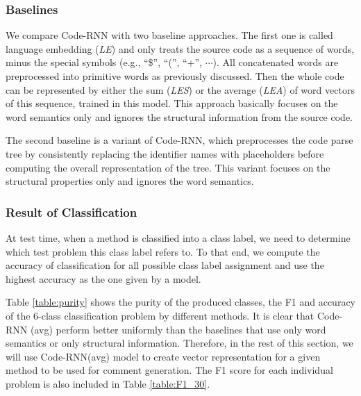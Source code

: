 \subsubsection{Baselines}

We compare Code-RNN with two baseline approaches.
The first one is called language embedding (\emph{LE}) and only treats the
source code as a sequence of words, minus the special symbols
(e.g., ``\$'', ``('', ``+'', $\cdots$). All concatenated words are preprocessed
into primitive words as previously discussed. Then the whole code can be
represented by either the sum (\emph{LES}) or the average (\emph{LEA})  of word vectors
of this sequence, trained in this model.%
This approach basically focuses on the word semantics only and ignores the
structural information from the source code.

The second baseline is a variant of Code-RNN, which preprocesses the code parse
tree by consistently replacing the identifier names with placeholders before
computing the overall representation of the tree. This variant focuses on
the structural properties only and ignores the word semantics.


\subsubsection{Result of Classification}
At test time, when a method is classified into a class label,
we need to determine which test problem this class label refers to.
To that end, we compute the accuracy of classification for
all possible class label assignment and use the highest
accuracy as the one given by a model.

Table \ref{table:purity} shows the purity of the produced classes, the F1
and accuracy of the 6-class classification problem by different methods. It is
clear that Code-RNN (avg) perform better uniformly
than the baselines that use only word semantics or only structural information.
Therefore, in the rest of this section, we will use Code-RNN(avg) model to
create vector representation for a given method to be used for
comment generation.
The F1 score for each individual problem is also included in
Table \ref{table:F1_30}.

